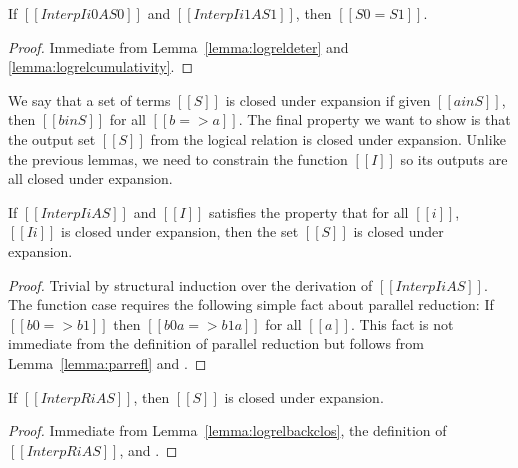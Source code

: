 \documentclass[nonacm]{acmart}
\begin{document}
\begin{corollary}
  \label{lemma:logreldeterhet}
  If $[[Interp I i0 A S0]]$ and $[[Interp I i1 A S1]]$, then $[[S0 = S1]]$.
\end{corollary}
\begin{proof}
  Immediate from Lemma~\ref{lemma:logreldeter} and
  \ref{lemma:logrelcumulativity}.
\end{proof}

We say that a set of terms $[[S]]$ is closed under expansion if given
$[[a in S]]$, then $[[b in S]]$ for all $[[b => a]]$.
The final property we want to show is that the output set $[[S]]$ from
the logical relation is closed under expansion. Unlike the previous
lemmas, we need to constrain the function $[[I]]$ so its outputs are
all closed under expansion.
\begin{lemma}
  \label{lemma:logrelbackclos}
  If $[[Interp I i A S]]$ and $[[I]]$ satisfies the property that
  for all $[[i]]$, $[[I i]]$ is closed under expansion, then the set
  $[[S]]$ is closed under expansion.
\end{lemma}
\begin{proof}
  Trivial by structural induction over the derivation of $[[Interp I i
  A S]]$. The function case requires the following simple fact about
  parallel reduction:
  If $[[b0 => b1]]$ then $[[b0 a => b1 a]]$ for all $[[a]]$. This fact
  is not immediate from the definition of parallel reduction but
  follows from Lemma~\ref{lemma:parrefl} and .
\end{proof}

\begin{corollary}
  \label{lemma:logrelNbackclos}
  If $[[InterpR i A S]]$, then $[[S]]$ is closed under expansion.
\end{corollary}
\begin{proof}
  Immediate from Lemma~\ref{lemma:logrelbackclos}, the definition of
  $[[InterpR i A S]]$, and .
\end{proof}
\end{document}
